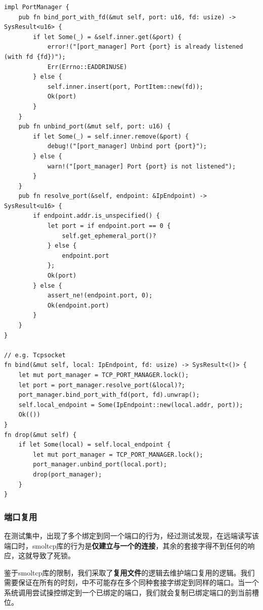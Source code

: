 \documentclass{article}
\begin{document}
\begin{lstlisting}
impl PortManager {
    pub fn bind_port_with_fd(&mut self, port: u16, fd: usize) -> SysResult<u16> {
        if let Some(_) = &self.inner.get(&port) {
            error!("[port_manager] Port {port} is already listened (with fd {fd})");
            Err(Errno::EADDRINUSE)
        } else {
            self.inner.insert(port, PortItem::new(fd));
            Ok(port)
        }
    }
    pub fn unbind_port(&mut self, port: u16) {
        if let Some(_) = self.inner.remove(&port) {
            debug!("[port_manager] Unbind port {port}");
        } else {
            warn!("[port_manager] Port {port} is not listened");
        }
    }
    pub fn resolve_port(&self, endpoint: &IpEndpoint) -> SysResult<u16> {
        if endpoint.addr.is_unspecified() {
            let port = if endpoint.port == 0 {
                self.get_ephemeral_port()?
            } else {
                endpoint.port
            };
            Ok(port)
        } else {
            assert_ne!(endpoint.port, 0);
            Ok(endpoint.port)
        }
    }
}

// e.g. Tcpsocket
fn bind(&mut self, local: IpEndpoint, fd: usize) -> SysResult<()> {
    let mut port_manager = TCP_PORT_MANAGER.lock();
    let port = port_manager.resolve_port(&local)?;
    port_manager.bind_port_with_fd(port, fd).unwrap();
    self.local_endpoint = Some(IpEndpoint::new(local.addr, port));
    Ok(())
}
fn drop(&mut self) {
    if let Some(local) = self.local_endpoint {
        let mut port_manager = TCP_PORT_MANAGER.lock();
        port_manager.unbind_port(local.port);
        drop(port_manager);
    }
}
\end{lstlisting}

\subsubsection{端口复用}

在测试集中，出现了多个绑定到同一个端口的行为，经过测试发现，在远端读写该端口时，smoltcp库的行为是\textbf{仅建立与一个的连接}，其余的套接字得不到任何的响应，这就导致了死锁。

鉴于smoltcp库的限制，我们采取了\textbf{复用文件}的逻辑去维护端口复用的逻辑。我们需要保证在所有的时刻，中不可能存在多个同种套接字绑定到同样的端口。当一个系统调用尝试操控绑定到一个已绑定的端口，我们就会复制已绑定端口的到当前槽位。
\end{document}
